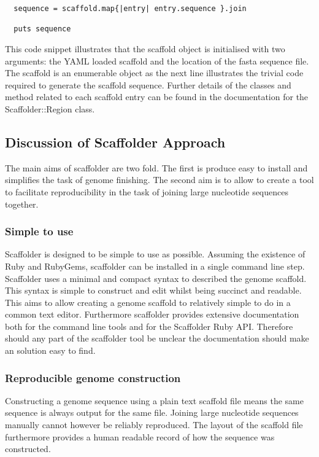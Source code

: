 \documentclass[10pt]{bmc_article}
\newenvironment{bmcformat}{\begin{raggedright}\baselineskip20pt\sloppy\setboolean{publ}{false}}{\end{raggedright}\baselineskip20pt\sloppy}
\begin{document}
\begin{bmcformat}
\begin{verbatim}
  sequence = scaffold.map{|entry| entry.sequence }.join

  puts sequence
\end{verbatim}

This code snippet illustrates that the scaffold object is initialised with two
arguments: the YAML loaded scaffold and the location of the fasta sequence
file. The scaffold is an enumerable object as the next line illustrates the
trivial code required to generate the scaffold sequence. Further details of
the classes and method related to each scaffold entry can be found in the
documentation for the Scaffolder::Region class. \pb

\subsection*{Discussion of Scaffolder Approach} %

The main aims of scaffolder are two fold. The first is produce easy to
install and simplifies the task of genome finishing. The second aim is to
allow to create a tool to facilitate reproducibility in the task of joining
large nucleotide sequences together. \pb

\subsubsection{Simple to use}

Scaffolder is designed to be simple to use as possible. Assuming the existence
of Ruby and RubyGems, scaffolder can be installed in a single command line
step. Scaffolder uses a minimal and compact syntax to described the genome
scaffold. This syntax is simple to construct and edit whilst being succinct
and readable. This aims to allow creating a genome scaffold to relatively
simple to do in a common text editor. Furthermore scaffolder provides
extensive documentation both for the command line tools and for the Scaffolder
Ruby API. Therefore should any part of the scaffolder tool be unclear the
documentation should make an solution easy to find. \pb

\subsubsection{Reproducible genome construction}

Constructing a genome sequence using a plain text scaffold file means the same
sequence is always output for the same file. Joining large nucleotide
sequences manually cannot however be reliably reproduced. The layout of the
scaffold file furthermore provides a human readable record of how the sequence
was constructed. \pb


\end{bmcformat}
\end{document}
